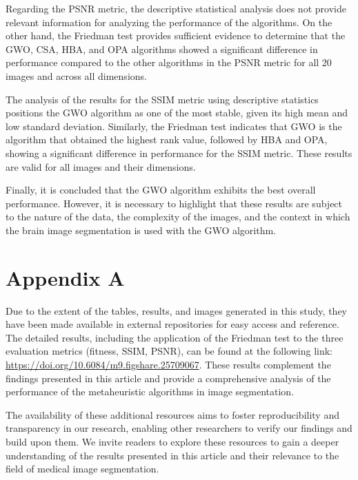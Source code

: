 \documentclass{elsarticle}
\begin{document}
\noindent Regarding the PSNR metric, the descriptive statistical analysis does not provide relevant information for analyzing the performance of the algorithms. On the other hand, the Friedman test provides sufficient evidence to determine that the GWO, CSA, HBA, and OPA algorithms showed a significant difference in performance compared to the other algorithms in the PSNR metric for all 20 images and across all dimensions.

\noindent The analysis of the results for the SSIM metric using descriptive statistics positions the GWO algorithm as one of the most stable, given its high mean and low standard deviation. Similarly, the Friedman test indicates that GWO is the algorithm that obtained the highest rank value, followed by HBA and OPA, showing a significant difference in performance for the SSIM metric. These results are valid for all images and their dimensions.

\noindent Finally, it is concluded that the GWO algorithm exhibits the best overall performance. However, it is necessary to highlight that these results are subject to the nature of the data, the complexity of the images, and the context in which the brain image segmentation is used with the GWO algorithm.

\section{Appendix A}
\label{sec:appendix}
\noindent Due to the extent of the tables, results, and images generated in this study, they have been made available in external repositories for easy access and reference. The detailed results, including the application of the Friedman test to the three evaluation metrics (fitness, SSIM, PSNR), can be found at the following link: \url{https://doi.org/10.6084/m9.figshare.25709067}. These results complement the findings presented in this article and provide a comprehensive analysis of the performance of the metaheuristic algorithms in image segmentation.

\noindent The availability of these additional resources aims to foster reproducibility and transparency in our research, enabling other researchers to verify our findings and build upon them. We invite readers to explore these resources to gain a deeper understanding of the results presented in this article and their relevance to the field of medical image segmentation.
\end{document}
